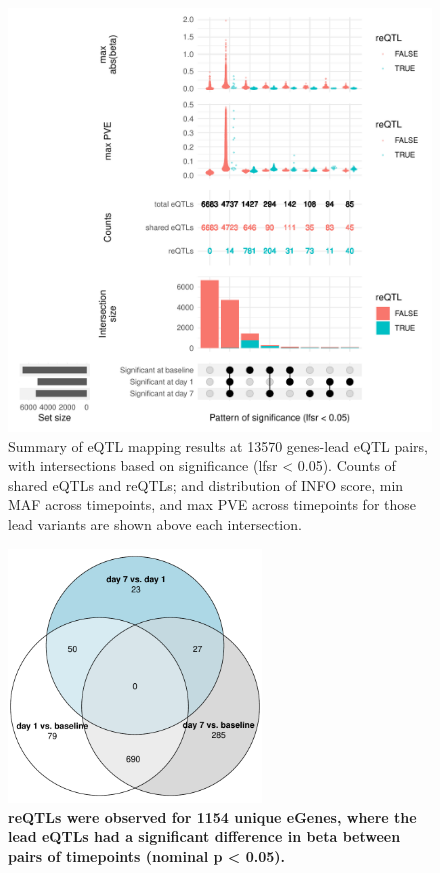 \begin{figure}
    \centering
    \includegraphics[width=1.0\textwidth]{mainmatter/figures/chapter_03/compare_dge_eqtl.upset.pdf}
    \caption{
        Summary of eQTL mapping results at 13570 genes-lead eQTL pairs,
        with intersections based on significance (lfsr < 0.05).
        Counts of shared eQTLs and reQTLs; and distribution of INFO score, min MAF across timepoints, and max PVE across timepoints for those lead variants are shown above each intersection.
    }
    \label{fig:hird_eQTL_upset_mega}
\end{figure}

\begin{figure}
    \centering
    \includegraphics[width=0.6\textwidth]{mainmatter/figures/chapter_03/compare_dge_eqtl.pairwise_reQTL_venn.pdf}
    \caption{
        \textbf{\glspl{reQTL} were observed for 1154 unique eGenes, where the lead \glspl{eQTL} had a significant difference in beta between pairs of timepoints (nominal p < 0.05).}
    }
    \label{fig:hird_reQTL_pairwise_venn}
\end{figure}


